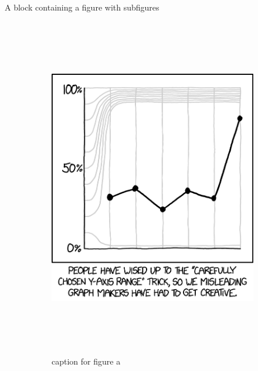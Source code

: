 \documentclass[final]{beamer}
\newlength{\colwidth}
\begin{document}
\begin{frame}[t]
\begin{columns}[t]
\begin{column}{\colwidth}
\begin{block}{A block containing a figure with subfigures}
    \begin{figure}
      \centering
      \begin{subfigure}{0.49\textwidth}
        \centering
        \includegraphics[height=15cm]{./images/y_axis_2x.png}
        \caption{caption for figure a}    %
      \end{subfigure}
      \hfill
      \begin{subfigure}{0.49\textwidth}
        \centering

\end{subfigure}
\end{figure}
\end{block}
\end{column}
\end{columns}
\end{frame}
\end{document}
